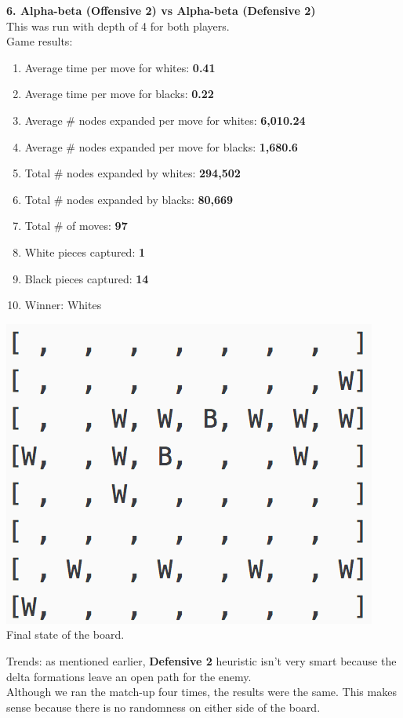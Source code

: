 \documentclass[11pt]{article}
\begin{document}
\pagebreak
\textbf{6. Alpha-beta (Offensive 2) vs Alpha-beta (Defensive 2)}\\
This was run with depth of 4 for both players.\\
Game results:\\
\begin{enumerate}
\item Average time per move for whites: \textbf{0.41}
\item Average time per move for blacks: \textbf{0.22}
\item Average \# nodes expanded per move for whites: \textbf{6,010.24}
\item Average \# nodes expanded per move for blacks:  \textbf{1,680.6}
\item Total \# nodes expanded by whites: \textbf{294,502}
\item Total \# nodes expanded by blacks: \textbf{80,669}
\item Total \# of moves: \textbf{97}
\item White pieces captured: \textbf{1}
\item Black pieces captured: \textbf{14}
\item Winner: Whites
\end{enumerate}
\begin{center}
\includegraphics[scale=1]{part2/ab-o2-vs-ab-d2.png}\\
Final state of the board.
\end{center}
Trends: as mentioned earlier, \textbf{Defensive 2} heuristic isn't very smart because the delta formations leave an open path for the enemy.\\
Although we ran the match-up four times, the results were the same. This makes sense because there is no randomness on either side of the board. \\
\end{document}
